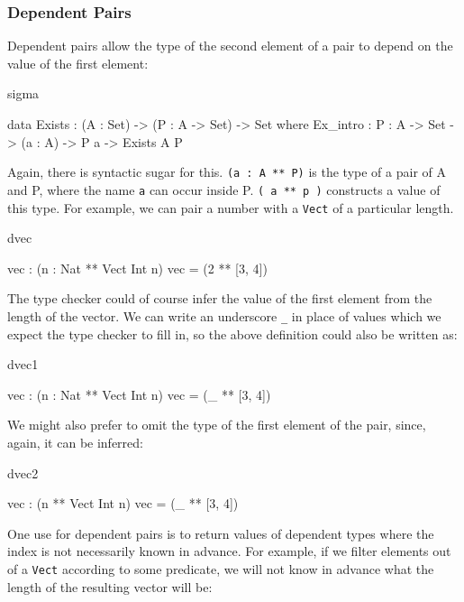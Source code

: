 \subsubsection*{Dependent Pairs}

Dependent pairs allow the type of the second element of a pair to depend on
the value of the first element:

\begin{SaveVerbatim}{sigma}

data Exists : (A : Set) -> (P : A -> Set) -> Set where
   Ex_intro : {P : A -> Set} -> (a : A) -> P a -> Exists A P

\end{SaveVerbatim}

\noindent
Again, there is syntactic sugar for this. \texttt{(a : A ** P)} is the type of a pair of
A and P, where the name \texttt{a} can occur inside P. \texttt{( a ** p )} 
constructs a value of this type. For example, we can pair a number with a 
\texttt{Vect} of a particular length.

\begin{SaveVerbatim}{dvec}

vec : (n : Nat ** Vect Int n)
vec = (2 ** [3, 4])

\end{SaveVerbatim}

\noindent
The type checker could of course infer the value of the first element from the
length of the vector. We can write an underscore \texttt{\_} in place of values which we
expect the type checker to fill in, so the above definition could also be
written as:

\begin{SaveVerbatim}{dvec1}

vec : (n : Nat ** Vect Int n)
vec = (_ ** [3, 4])

\end{SaveVerbatim}

\noindent
We might also prefer to omit the type of the first element of the pair, since,
again, it can be inferred:

\begin{SaveVerbatim}{dvec2}

vec : (n ** Vect Int n)
vec = (_ ** [3, 4])

\end{SaveVerbatim}

\noindent
One use for dependent pairs is to return values of dependent types where the
index is not necessarily known in advance. For example, if we filter elements
out of a \texttt{Vect} according to some predicate, we will not know in advance what the
length of the resulting vector will be:

